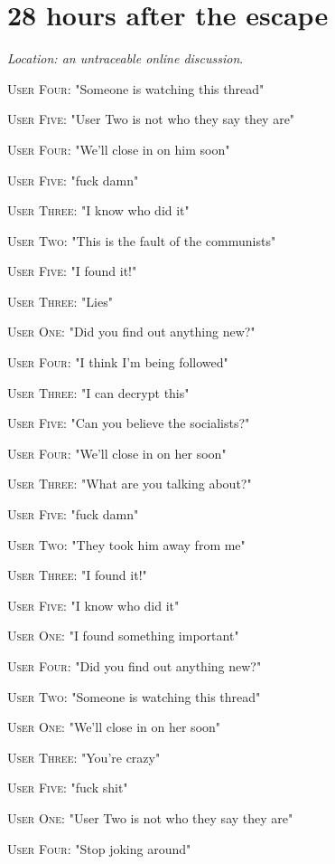 \documentclass{report}
\begin{document}
\section*{28 \small{hours after the escape}}

\textit{Location: an untraceable online discussion}. 

\textsc{User Four}: "Someone is watching this thread" 

\textsc{User Five}: "User Two is not who they say they are" 

\textsc{User Four}: "We'll close in on him soon" 

\textsc{User Five}: "fuck damn" 

\textsc{User Three}: "I know who did it" 

\textsc{User Two}: "This is the fault of the communists" 

\textsc{User Five}: "I found it!" 

\textsc{User Three}: "Lies" 

\textsc{User One}: "Did you find out anything new?" 

\textsc{User Four}: "I think I'm being followed" 

\textsc{User Three}: "I can decrypt this" 

\textsc{User Five}: "Can you believe the socialists?" 

\textsc{User Four}: "We'll close in on her soon" 

\textsc{User Three}: "What are you talking about?" 

\textsc{User Five}: "fuck damn" 

\textsc{User Two}: "They took him away from me" 

\textsc{User Three}: "I found it!" 

\textsc{User Five}: "I know who did it" 

\textsc{User One}: "I found something important" 

\textsc{User Four}: "Did you find out anything new?" 

\textsc{User Two}: "Someone is watching this thread" 

\textsc{User One}: "We'll close in on her soon" 

\textsc{User Three}: "You're crazy" 

\textsc{User Five}: "fuck shit" 

\textsc{User One}: "User Two is not who they say they are" 

\textsc{User Four}: "Stop joking around" 
\end{document}
